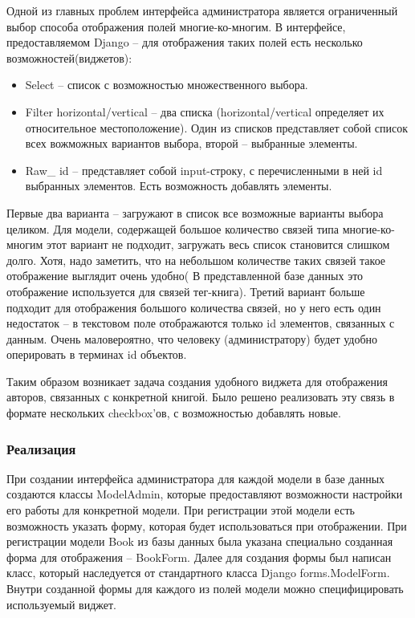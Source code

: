 \documentclass[a4paper]{report}
\begin{document}
Одной из главных проблем интерфейса администратора является ограниченный выбор способа отображения полей многие-ко-многим. В интерфейсе, предоставляемом Django -- для отображения таких полей есть несколько возможностей(виджетов):
\begin{itemize}
	\item Select -- список с возможностью множественного выбора.
	\item Filter horizontal/vertical -- два списка (horizontal/vertical определяет их относительное местоположение). Один из списков представляет собой список всех вожможных вариантов выбора, второй -- выбранные элементы.
	\item Raw\_ id -- представляет собой input-строку, с перечисленными в ней id выбранных элементов. Есть возможность добавлять элементы.
\end{itemize}
Первые два варианта -- загружают в список все возможные варианты выбора целиком. Для модели, содержащей большое количество связей типа многие-ко-многим этот вариант не подходит, \tk загружать весь список становится слишком долго. Хотя, надо заметить, что на небольшом количестве таких связей такое отображение выглядит очень удобно( В представленной базе данных это отображение используется для связей тег-книга). 
Третий вариант больше подходит для отображения большого количества связей, но у него есть один недостаток -- в текстовом поле отображаются только id элементов, связанных с данным. Очень маловероятно, что человеку (администратору) будет удобно оперировать в терминах id объектов.

Таким образом возникает задача создания удобного виджета для отображения авторов, связанных с конкретной книгой.
Было решено реализовать эту связь в формате нескольких checkbox'ов, с возможностью добавлять
новые.

\subsubsection{Реализация}

При создании интерфейса администратора для каждой модели в базе данных создаются классы ModelAdmin, которые предоставляют возможности настройки его работы для конкретной модели. При регистрации этой модели есть возможность указать форму, которая будет использоваться при отображении. При регистрации модели Book из базы данных была указана специально созданная форма для отображения -- BookForm. Далее для создания формы был написан класс, который наследуется от стандартного класса Django forms.ModelForm. Внутри созданной формы для каждого из полей модели можно специфицировать используемый виджет.
\end{document}
